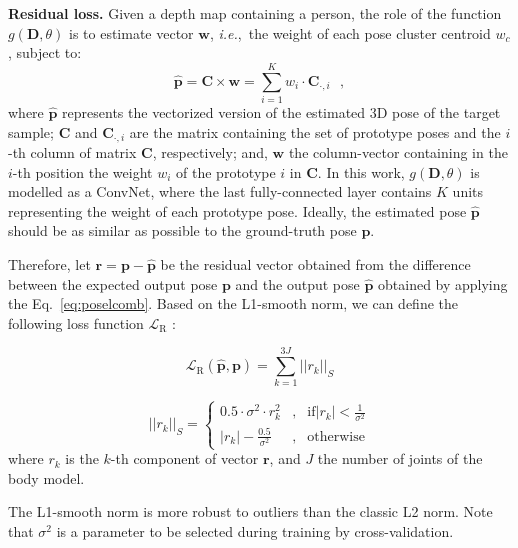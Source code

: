 \documentclass[review,12pt,3p]{elsarticle}
\def \ie{\textit{i.e.}}
\newcommand{\myparagraph}[1]{\noindent \textbf{#1}}
\begin{document}
\myparagraph{Residual loss.}
Given a depth map containing a person, the role of the function $g(\mathbf{D}, \theta)$ is to estimate vector $\mathbf{w}$, \ie,~the weight of each pose cluster centroid $w_c$, subject to:
\begin{equation}\label{eq:poselcomb}
    \hat{\mathbf{p}} = \mathbf{C} \times \mathbf{w} = \sum_{i=1}^K w_i \cdot \mathbf{C}_{\cdot,i} \textrm{ },
\end{equation}
where $\hat{\mathbf{p}}$ represents the vectorized version of the estimated 3D pose of the target sample; $\mathbf{C}$ and $\mathbf{C}_{\cdot,i}$ are the matrix containing the set of prototype poses and the $i$-th column of matrix $\mathbf{C}$, respectively; and, $\mathbf{w}$ the column-vector containing in the $i$-th position the weight $w_i$  of the prototype $i$ in $\mathbf{C}$. 
%
%
In this work, $g(\mathbf{D}, \theta)$ is modelled as a ConvNet, where the last fully-connected layer contains $K$ units representing the weight of each prototype pose. Ideally, the estimated pose $\hat{\mathbf{p}}$ should be as similar as possible to the ground-truth pose $\mathbf{p}$.

Therefore, let $\mathbf{r}= \mathbf{p} - \hat{\mathbf{p}}$ be the residual vector obtained from the difference between the expected output pose $\mathbf{p}$ and the output pose $\hat{\mathbf{p}}$ obtained by applying the Eq.~\ref{eq:poselcomb}. 
%
Based on the L1-smooth norm, we can define the following loss function $\mathcal{L}_{\text{R}}$ :

\begin{equation}\label{eq:regLoss}
   \mathcal{L}_{\text{R}}(\mathbf{\hat{p}},\mathbf{p}) = \sum_{k=1}^{3J} ||r_k||_{S}
\end{equation}

\begin{equation}\label{eq:l1smoothnorm}
  ||r_{k}||_S=
      \left\{
                \begin{array}{lcl}
                  0.5 \cdot \sigma^2 \cdot r_{k}^2 &,& \mathrm{if} |r_{k}| < \frac{1}{\sigma^2} \\
                  |r_{k}| - \frac{0.5}{\sigma^2} &,& \mathrm{otherwise}
                \end{array}
              \right.
\end{equation}
%
where $r_{k}$ is the $k$-th component of vector $\mathbf{r}$, and $J$  the number of joints of the body model.

The L1-smooth norm is more robust to outliers than the classic L2 norm. Note that $\sigma^2$ is a parameter to be selected during training by cross-validation.
\end{document}
